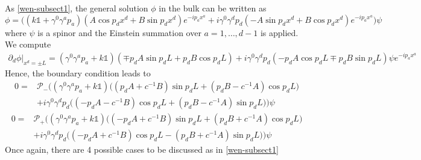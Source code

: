 As \cref{wen-subsect1}, the general solution $\phi$ in the bulk can be written as
\begin{equation*}
\phi 
 =\Big( (k \mathbb{1}+ \gamma^0\gamma^a p_a )(A \cos p_d x^d + B \sin p_d x^d)e^{-ip_a x^a}
+ i\gamma^0\gamma^d p_d (-A \sin p_d x^d + B \cos p_d x^d) e^{-ip_a x^a} \Big) \psi
 \end{equation*}
 where $\psi $ is a spinor and the Einstein summation over $a = 1, \ldots, d-1$ is applied. \\
 We compute
\begin{equation*}
\begin{split}
\partial_d \phi\vert_{x^d = \pm L }
= (\gamma^0\gamma^a p_a + k\mathbb{1})(\mp p_d A \sin p_d L + p_d B \cos p_d L)
+ i\gamma^0\gamma^d p_d(-p_d A \cos p_d L \mp p_d B \sin p_d L)\psi e^{-ip_a x^a}
\end{split}
\end{equation*}
Hence, the boundary condition leads to
\begin{equation*}
\begin{split}
0 = &\mathcal{P}_-\Bigg(
(\gamma^0\gamma^a p_a + k\mathbb{1})\Big((p_d A + c^{-1}B) \sin p_d L + (p_d B - c^{-1}A) \cos p_d L\Big) \\
& + i\gamma^0\gamma^d p_d \Big((-p_d A -c^{-1} B) \cos p_d L + (p_d B - c^{-1} A )\sin p_d L\Big) 
\Bigg)\psi
\end{split}
\end{equation*}
\begin{equation*}
\begin{split}
0 = &\mathcal{P}_+\Bigg(
(\gamma^0\gamma^a p_a + k\mathbb{1})\Big((- p_d A + c^{-1}B) \sin p_d L + (p_d B + c^{-1}A) \cos p_d L\Big) \\
& + i\gamma^0\gamma^d p_d \Big((-p_d A + c^{-1} B )\cos p_d L - (p_d B + c^{-1} A )\sin p_d L\Big) 
\Bigg)\psi
\end{split}
\end{equation*}
Once again, there are 4 possible cases to be discussed as in \cref{wen-subsect1}
%
